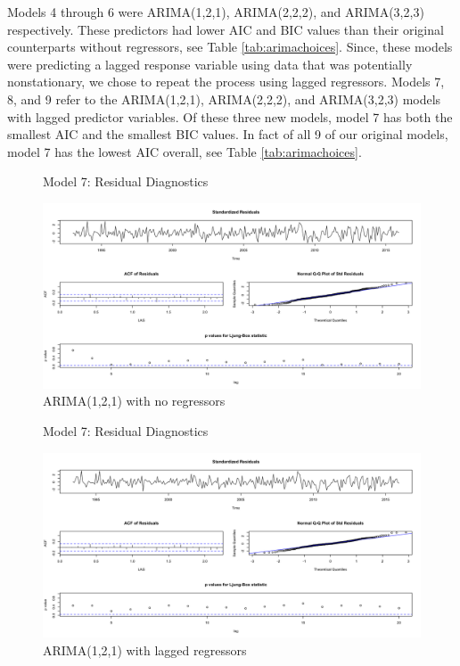 \documentclass[twoside,twocolumn]{article}
\begin{document}
Models 4 through 6 were ARIMA(1,2,1), ARIMA(2,2,2), and ARIMA(3,2,3) respectively.  These predictors had lower AIC and BIC values than their original counterparts without regressors, see Table \ref{tab:arimachoices}. Since, these models were predicting a lagged response variable using data that was potentially nonstationary, we chose to repeat the process using lagged regressors.  Models 7, 8, and 9 refer to the ARIMA(1,2,1), ARIMA(2,2,2), and ARIMA(3,2,3) models with lagged predictor variables.  Of these three new models, model 7 has both the smallest AIC and the smallest BIC values. In fact of all 9 of our original models, model 7 has the lowest AIC overall, see Table \ref{tab:arimachoices}.  


		    \begin{figure}[htb]
    	\centering
    	\caption{Model 7: Residual Diagnostics}
     	\includegraphics[width=\linewidth]{images/sarima1}
     	\caption*{ARIMA(1,2,1) with no regressors}
     	\label{fig:sarimamod1}
     \end{figure}


    \begin{figure}[htb]
    	\centering
    	\caption{Model 7: Residual Diagnostics}
     	\includegraphics[width=\linewidth]{images/sarima7}
     	\caption*{ARIMA(1,2,1) with lagged regressors}
     	\label{fig:sarimamod7}
     \end{figure}
     
\end{document}
